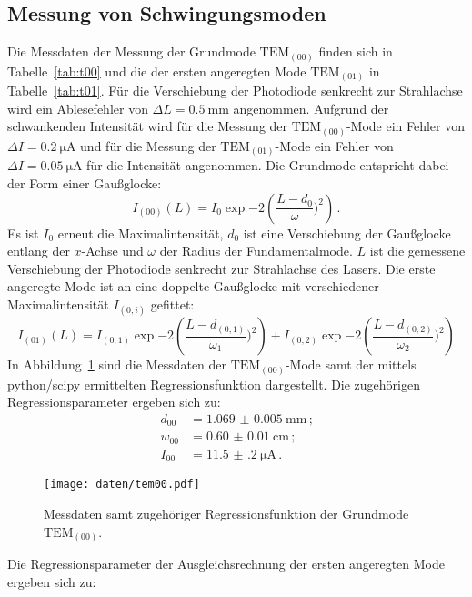 \subsection{Messung von Schwingungsmoden}
Die Messdaten der Messung der Grundmode $\text{TEM}_{(00)}$ finden sich in Tabelle~\ref{tab:t00} und die der ersten angeregten Mode $\text{TEM}_{(01)}$ in Tabelle~\ref{tab:t01}.
Für die Verschiebung der Photodiode senkrecht zur Strahlachse wird ein Ablesefehler von $\Delta L=\SI{0.5}{\milli\meter}$ angenommen.
Aufgrund der schwankenden Intensität wird für die Messung der $\text{TEM}_{(00)}$-Mode ein Fehler von $\Delta I=\SI{0.2}{\micro\ampere}$ und für die Messung der $\text{TEM}_{(01)}$-Mode ein Fehler von $\Delta I=\SI{0.05}{\micro\ampere}$ für die Intensität angenommen.
Die Grundmode entspricht dabei der Form einer Gaußglocke:
\begin{equation}
  I_{(00)}(L)=I_0 \exp{-2\left(\frac{L-d_0}{\omega})^2\right)}\,\text{.}
\end{equation}
Es ist $I_0$ erneut die Maximalintensität, $d_0$ ist eine Verschiebung der Gaußglocke entlang der $x$-Achse und $\omega$ der Radius der Fundamentalmode. $L$ ist die gemessene Verschiebung der Photodiode senkrecht zur Strahlachse des Lasers.
Die erste angeregte Mode ist an eine doppelte Gaußglocke mit verschiedener Maximalintensität $I_{(0,i)}$ gefittet:
\begin{equation}
    I_{(01)}(L)=I_{(0,1)} \exp{-2\left( \frac{L-d_{(0,1)}}{\omega_1})^2\right)}+I_{(0,2)} \exp{-2\left( \frac{L-d_{(0,2)}}{\omega_2})^2\right)}
\end{equation}
In Abbildung~\ref{fig:tem00} sind die Messdaten der $\text{TEM}_{(00)}$-Mode samt der mittels python/scipy ermittelten Regressionsfunktion dargestellt.
Die zugehörigen Regressionsparameter ergeben sich zu:
\begin{align}
  d_{00}&=\SI{1.069(5)}{\milli\meter}\,\text{;}\\ w_{00}&=\SI{0.60(1)}{\centi\meter}\,\text{;}\\ I_{00}&=\SI{11.5(2)}{\micro\ampere}\,\text{.}
\end{align}
\begin{figure}
  \centering
  \texttt{[image: daten/tem00.pdf]}
  \caption{Messdaten samt zugehöriger Regressionsfunktion der Grundmode $\text{TEM}_{(00)}$.}
  \label{fig:tem00}
\end{figure}


Die Regressionsparameter der Ausgleichsrechnung der ersten angeregten Mode ergeben sich zu:
